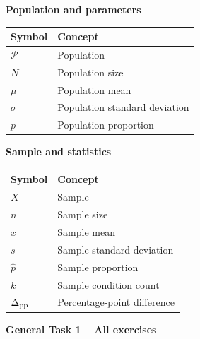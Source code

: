 \begingroup
\small
\setlength{\tabcolsep}{3pt}
\setlength{\extrarowheight}{0pt}
\setlength{\parskip}{2pt}
\renewcommand{\arraystretch}{1}
\newcommand{\pairedrow}[1][2]{\rule[-\dimexpr#1\baselineskip-\baselineskip+\dp\strutbox\relax]{0pt}{\dimexpr#1\baselineskip\relax}}
\noindent\begin{minipage}[t]{.49\linewidth}
\vspace{0pt}
\textbf{Population and parameters}\par
\begin{tabularx}{\linewidth}{@{}>{\raggedright\arraybackslash}p{.14\linewidth}L@{}}
\toprule
\textbf{Symbol} & \textbf{Concept} \\
\midrule
$\mathcal{P}$\pairedrow & Population \\
$N$\pairedrow[1] & Population size \\
$\mu$\pairedrow & Population mean \\
$\sigma$\pairedrow & Population standard deviation \\
$p$\pairedrow & Population proportion \\
\bottomrule
\end{tabularx}\par
\end{minipage}\hfill
\begin{minipage}[t]{.49\linewidth}
\vspace{0pt}
\textbf{Sample and statistics}\par
\begin{tabularx}{\linewidth}{@{}>{\raggedright\arraybackslash}p{.14\linewidth}L@{}}
\toprule
\textbf{Symbol} & \textbf{Concept} \\
\midrule
$X$\pairedrow & Sample \\
$n$\pairedrow[1] & Sample size \\
$\bar{x}$\pairedrow & Sample mean \\
$s$\pairedrow & Sample standard deviation \\
$\hat{p}$\pairedrow & Sample proportion \\
$k$ & Sample condition count \\
$\Delta_{\rm pp}$ & Percentage-point difference \\
\bottomrule
\end{tabularx}\par
\end{minipage}\par
\endgroup

\vspace{-3mm}
\begin{center}
    {\large\bfseries General Task 1 -- All exercises}
\end{center}
\vspace{-4mm}

